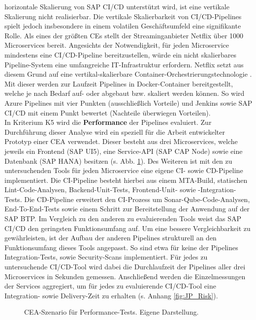 horizontale Skalierung von SAP CI/CD unterstützt wird, ist eine vertikale Skalierung nicht realisierbar. Die vertikale Skalierbarkeit von CI/CD-Pipelines spielt jedoch insbesondere in einem volatilen Geschäftsumfeld eine signifikante Rolle. Als eines der größten CEs stellt der Streaminganbieter Netflix über 1000 Microservices bereit. Angesichts der Notwendigkeit, für jeden Microservice mindestens eine CI/CD-Pipeline bereitzustellen, würde ein nicht skalierbares Pipeline-System eine umfangreiche IT-Infrastruktur erfordern. Netflix setzt aus diesem Grund auf eine vertikal-skalierbare Container-Orchestrierungstechnologie \cite{Blog.20170419}\cite{CloudZero.20230419}. Mit dieser werden zur Laufzeit Pipelines in Docker-Container bereitgestellt, welche je nach Bedarf auf- oder abgebaut bzw. skaliert werden können. So wird Azure Pipelines mit vier Punkten (ausschließlich Vorteile) und Jenkins sowie SAP CI/CD mit einem Punkt bewertet (Nachteile überwiegen Vorteilen).\\ In Kriterium K5 wird die \textbf{Performance} der Pipelines evaluiert. Zur Durchführung dieser Analyse wird ein speziell für die Arbeit entwickelter Prototyp einer CEA verwendet. Dieser besteht aus drei Microservices, welche jeweils ein Frontend (SAP UI5), eine Service-API (SAP CAP Node) sowie eine Datenbank (SAP HANA) besitzen (s. Abb. \ref{fig:Szenario}).
 Des Weiteren ist mit den zu untersuchenden Tools für jeden Microservice eine eigene CI- sowie CD-Pipeline implementiert. Die CI-Pipeline besteht hierbei aus einem MTA-Build, statischen Lint-Code-Analysen, Backend-Unit-Tests, Frontend-Unit- sowie -Integration-Tests. Die CD-Pipeline erweitert den CI-Prozess um Sonar-Qube-Code-Analysen, End-To-End-Tests sowie einem Schritt zur Bereitstellung der Anwendung auf der SAP BTP. Im Vergleich zu den anderen zu evaluierenden Tools weist das SAP CI/CD den geringsten Funktionsumfang auf. Um eine bessere Vergleichbarkeit zu gewährleisten, ist der Aufbau der anderen Pipelines strukturell an den Funktionsumfang dieses Tools angepasst. So sind etwa für keine der Pipelines Integration-Tests, sowie Security-Scans implementiert. Für jedes zu untersuchende CI/CD-Tool wird dabei die Durchlaufzeit der Pipelines aller drei Microservices in Sekunden gemessen. Anschließend werden die Einzelmessungen der Services aggregiert, um für jedes zu evaluierende CI/CD-Tool eine Integration- sowie Delivery-Zeit zu erhalten (s. Anhang \ref{fig:JP_Risk}). 
 \begin{center}
	\begin{figure}[H]\hspace*{-13mm}
		\centering
		\caption[CEA-Szenario für Performance-Tests]{CEA-Szenario für Performance-Tests. Eigene Darstellung.}
		\label{fig:Szenario}
	\end{figure}
\end{center}
